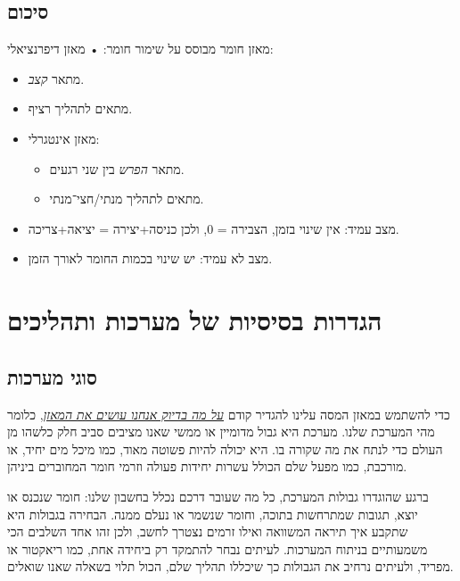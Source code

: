 \documentclass[
  hebrew,
  letterpaper,
  DIV=11,
  numbers=noendperiod]{scrreprt}
\begin{document}
\subsection{סיכום}\label{ux5e1ux5d9ux5dbux5d5ux5dd-6}

מאזן חומר מבוסס על שימור חומר: • מאזן דיפרנציאלי:

\begin{itemize}
\item
  מתאר \emph{קצב}.
\item
  מתאים לתהליך רציף.
\end{itemize}

\begin{itemize}
\item
  מאזן אינטגרלי:

  \begin{itemize}
  \item
    מתאר \emph{הפרש} בין שני רגעים.
  \item
    מתאים לתהליך מנתי/חצי־מנתי.
  \end{itemize}
\item
  מצב עמיד: אין שינוי בזמן, הצבירה = 0, ולכן כניסה+יצירה = יציאה+צריכה.
\item
  מצב לא עמיד: יש שינוי בכמות החומר לאורך הזמן.
\end{itemize}

\section{הגדרות בסיסיות של מערכות
ותהליכים}\label{ux5d4ux5d2ux5d3ux5e8ux5d5ux5ea-ux5d1ux5e1ux5d9ux5e1ux5d9ux5d5ux5ea-ux5e9ux5dc-ux5deux5e2ux5e8ux5dbux5d5ux5ea-ux5d5ux5eaux5d4ux5dcux5d9ux5dbux5d9ux5dd}

\subsection{סוגי
מערכות}\label{ux5e1ux5d5ux5d2ux5d9-ux5deux5e2ux5e8ux5dbux5d5ux5ea}

כדי להשתמש במאזן המסה עלינו להגדיר קודם \emph{\ul{על מה בדיוק אנחנו
עושים את המאזן}}, כלומר מהי המערכת שלנו. מערכת היא גבול מדומיין או ממשי
שאנו מציבים סביב חלק כלשהו מן העולם כדי לנתח את מה שקורה בו. היא יכולה
להיות פשוטה מאוד, כמו מיכל מים יחיד, או מורכבת, כמו מפעל שלם הכולל עשרות
יחידות פעולה וזרמי חומר המחוברים ביניהן.

ברגע שהוגדרו גבולות המערכת, כל מה שעובר דרכם נכלל בחשבון שלנו: חומר
שנכנס או יוצא, תגובות שמתרחשות בתוכה, וחומר שנשמר או נעלם ממנה. הבחירה
בגבולות היא שתקבע איך תיראה המשוואה ואילו זרמים נצטרך לחשב, ולכן זהו אחד
השלבים הכי משמעותיים בניתוח המערכות. לעיתים נבחר להתמקד רק ביחידה אחת,
כמו ריאקטור או מפריד, ולעיתים נרחיב את הגבולות כך שיכללו תהליך שלם, הכול
תלוי בשאלה שאנו שואלים.
\end{document}
